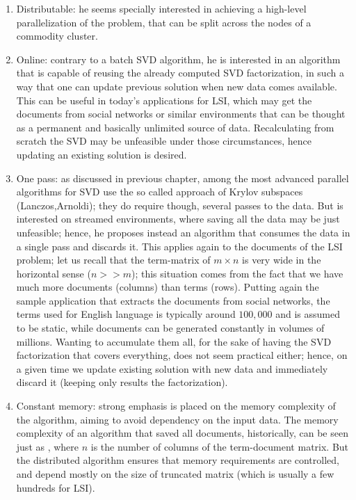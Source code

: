 \begin{enumerate}
\item Distributable: he seems specially interested in achieving a
  high-level parallelization of the problem, that can be split across
  the nodes of a commodity cluster.\\

\item Online: contrary to a batch SVD algorithm, he is interested in
  an algorithm that is capable of 
  reusing the already computed SVD factorization, in such a way that
  one can update previous solution when new data comes available. This
  can be useful in today's applications for LSI, which may get the
  documents from social networks or similar environments that can be
  thought as a permanent and basically unlimited source of
  data. Recalculating from scratch the SVD may be unfeasible under
  those circumstances, hence updating an existing solution is
  desired.\\

\item One pass: as discussed in previous chapter, among the most advanced
  parallel algorithms for SVD use the so called approach of Krylov
  subspaces (Lanczos,Arnoldi); they do require though, several passes
  to the data. But \Rehurek is interested on streamed environments,
  where saving all the data may be just unfeasible; hence, he proposes
  instead an algorithm that consumes the data in a single pass and
  discards it. This applies again to the documents of the LSI 
  problem; let us recall that the term-matrix of $m \times n$ is very
  wide in the horizontal sense ($n >> m$); this situation comes from
  the fact that we have much more documents (columns) than terms
  (rows). Putting again the sample application that extracts the
  documents from social networks, the terms used for English
  language is typically around $100,000$ and is assumed to be static, while
  documents can be generated constantly in volumes of
  millions. Wanting to accumulate them all, for the sake of having the SVD
  factorization that covers everything, does not seem practical
  either; hence, on a given time we update existing solution with new
  data and immediately discard it (keeping only results the
  factorization). \\

\item Constant memory: strong emphasis is placed on the memory
  complexity of the algorithm, aiming to avoid dependency on the input
  data. The memory complexity of an algorithm that saved all
  documents, historically, can be seen just as , where $n$
  is the number of columns of the term-document matrix. But the
  distributed algorithm ensures that memory requirements are
  controlled, and depend mostly on the size of truncated matrix (which
  is usually a few hundreds for LSI).
\end{enumerate}
\hfill

